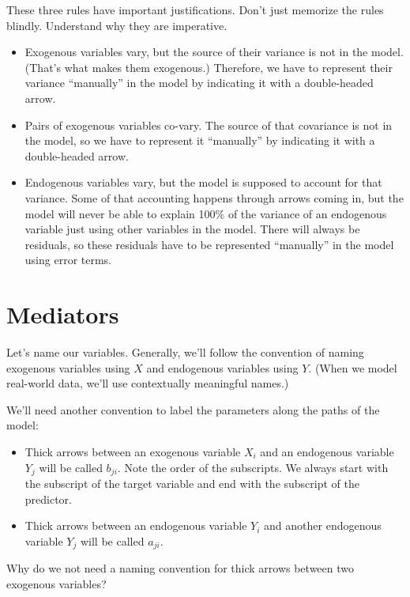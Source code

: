 \documentclass[
]{book}
\begin{document}
These three rules have important justifications. Don't just memorize the rules blindly. Understand why they are imperative.

\begin{itemize}
\item
  Exogenous variables vary, but the source of their variance is not in the model. (That's what makes them exogenous.) Therefore, we have to represent their variance ``manually'' in the model by indicating it with a double-headed arrow.
\item
  Pairs of exogenous variables co-vary. The source of that covariance is not in the model, so we have to represent it ``manually'' by indicating it with a double-headed arrow.
\item
  Endogenous variables vary, but the model is supposed to account for that variance. Some of that accounting happens through arrows coming in, but the model will never be able to explain 100\% of the variance of an endogenous variable just using other variables in the model. There will always be residuals, so these residuals have to be represented ``manually'' in the model using error terms.
\end{itemize}

\hypertarget{mediation-mediators}{%
\section{Mediators}\label{mediation-mediators}}

Let's name our variables. Generally, we'll follow the convention of naming exogenous variables using \(X\) and endogenous variables using \(Y\). (When we model real-world data, we'll use contextually meaningful names.)

We'll need another convention to label the parameters along the paths of the model:

\begin{itemize}
\item
  Thick arrows between an exogenous variable \(X_{i}\) and an endogenous variable \(Y_{j}\) will be called \(b_{ji}\). Note the order of the subscripts. We always start with the subscript of the target variable and end with the subscript of the predictor.
\item
  Thick arrows between an endogenous variable \(Y_{i}\) and another endogenous variable \(Y_{j}\) will be called \(a_{ji}\).
\end{itemize}

Why do we not need a naming convention for thick arrows between two exogenous variables?
\end{document}

